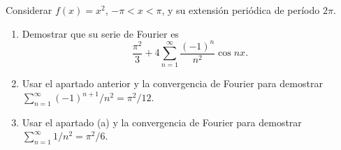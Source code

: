 Considerar \(f(x)=x^2\), \(-\pi<x<\pi\), y su extensión periódica de período \(2\pi\).

\begin{enumerate}[label=(\alph*),ref=\alph*,leftmargin=*]
\item Demostrar que su serie de Fourier es
\[\frac{\pi^2}{3}+4\sum_{n=1}^{\infty}\frac{(-1)^n}{n^2}\cos nx.\]
\item Usar el apartado anterior y la convergencia de Fourier para demostrar
\(\sum_{n=1}^{\infty}(-1)^{n+1}/n^2=\pi^2/12\).
\item Usar el apartado (a) y la convergencia de Fourier para demostrar
\(\sum_{n=1}^{\infty}1/n^2=\pi^2/6\).
\end{enumerate}
